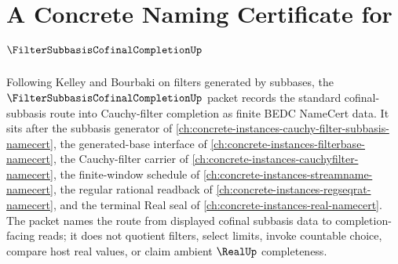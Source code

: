 \chapter{A Concrete Naming Certificate for $\FilterSubbasisCofinalCompletionUp$}
\label{ch:concrete-instances-filter-subbasis-cofinal-completion-namecert}

Following Kelley and Bourbaki on filters generated by subbases, the $\FilterSubbasisCofinalCompletionUp$ packet records the standard cofinal-subbasis route into Cauchy-filter completion as finite BEDC NameCert data. It sits after the subbasis generator of \autoref{ch:concrete-instances-cauchy-filter-subbasis-namecert}, the generated-base interface of \autoref{ch:concrete-instances-filterbase-namecert}, the Cauchy-filter carrier of \autoref{ch:concrete-instances-cauchyfilter-namecert}, the finite-window schedule of \autoref{ch:concrete-instances-streamname-namecert}, the regular rational readback of \autoref{ch:concrete-instances-regseqrat-namecert}, and the terminal Real seal of \autoref{ch:concrete-instances-real-namecert}. The packet names the route from displayed cofinal subbasis data to completion-facing reads; it does not quotient filters, select limits, invoke countable choice, compare host real values, or claim ambient $\RealUp$ completeness.

